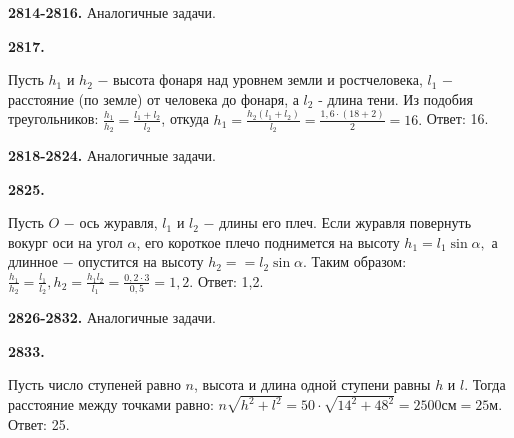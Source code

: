 \textbf{2814-2816.} Аналогичные задачи.

\textbf{2817.}
\begin{figure}[h]
\end{figure}
Пусть $h_1$ и $h_2$ $-$ высота фонаря над уровнем земли и рост\newline человека, $l_1$ $-$ расстояние (по земле) от человека до фонаря, а $l_2$ - длина тени. Из подобия треугольников:
$\frac{h_1}{h_2}=\frac{l_1+l_2}{l_2}$, откуда $h_1=\frac{h_2(l_1+l_2)}{l_2}=\frac{1,6\cdot(18+2)}{2}=16.$ \newline \null \hspace*{\fill} Ответ: 16. 

\textbf{2818-2824.} Аналогичные задачи.

\textbf{2825.}
\begin{figure}[h]
\end{figure}

Пусть $O$ $-$ ось журавля, $l_1$ и $l_2$ $-$ длины его плеч. Если журавля повернуть вокург оси на угол $\alpha$, его короткое плечо поднимется на высоту $h_1=l_1\sin\alpha,$ а длинное $-$ опустится на высоту $h_2=$\newline$=l_2\sin\alpha.$ Таким образом:
$\frac{h_1}{h_2}=\frac{l_1}{l_2}, h_2=\frac{h_1l_2}{l_1}=\frac{0,2\cdot3}{0,5}=1,2.$ \newline \null \hspace*{\fill} Ответ: 1,2. 

\textbf{2826-2832.} Аналогичные задачи.

\textbf{2833.} 
\begin{figure}[h]
\end{figure}
Пусть число ступеней равно $n$, высота и длина одной ступени равны $h$ и $l$. Тогда расстояние между точками равно:\newline
$n\sqrt{h^2+l^2}=50\cdot\sqrt{14^2+48^2}=2500\text{см}=25\text{м}$. \newline \null \hspace*{\fill} Ответ: 25. 

